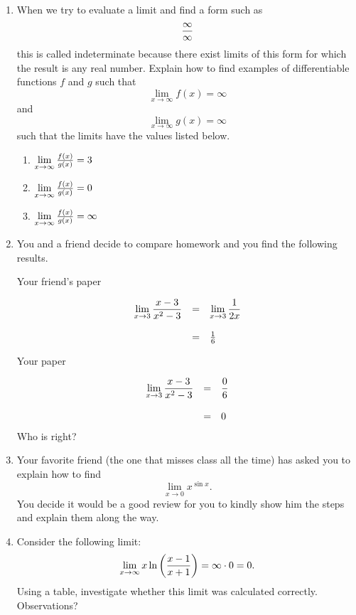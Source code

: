 \begin{enumerate}
\item  When we try to evaluate a limit and find a form such as $${\infty  \over \infty }$$ this is called indeterminate because there exist limits of this form for which the result is any real number.  Explain how to find examples of differentiable functions $f$ and $g$ such that $$\mathop {\lim }\limits_{x \to \infty } f(x) = \infty $$ and $$\mathop {\lim }\limits_{x \to \infty } g(x) = \infty $$ such that the limits have the values listed below.
\begin{enumerate}\item	$\mathop {\lim }\limits_{x \to \infty } {{f(x)} \over {g(x)}} = 3$\item		$\mathop {\lim }\limits_{x \to \infty } {{f(x)} \over {g(x)}} = 0$\item		$\mathop {\lim }\limits_{x \to \infty } {{f(x)} \over {g(x)}} = \infty $  \cite{FWG}\end{enumerate}

\item  You and a friend decide to compare homework and you find the following results.
\begin{center}{Your friend's paper}\end{center}
	$$\begin{array}{rcl}  \displaystyle{\mathop {\lim }\limits_{x \to 3} {{x - 3} \over {x^2  - 3}}}& = &\displaystyle{\mathop {\lim }\limits_{x \to 3} {1 \over {2x}}} \cr  \mbox{}&&\cr  &= &{1 \over 6} \cr \end{array}$$

\begin{center}Your paper\end{center}
$$\begin{array}{rcl}  \displaystyle{\mathop {\lim }\limits_{x \to 3} {{x - 3} \over {x^2  - 3}}} &=& \displaystyle{{0 \over 6}} \cr   \mbox{}&&\cr  &=& 0 \cr\end{array} $$
Who is right?  \cite{FWG}

\item  Your favorite friend (the one that misses class all the time) has asked you to explain how to find $$\mathop {\lim }\limits_{x \to 0} x^{\sin x} .$$  You decide it would be a good review for you to kindly show him the steps and explain them along the way.

\item  Consider the following limit:  $$\mathop {\lim }\limits_{x \to \infty } x\ln \left( {{{x - 1} \over {x + 1}}} \right) = \infty  \cdot 0 = 0.$$  Using a table, investigate whether this limit was calculated correctly.  Observations?


\end{enumerate}
